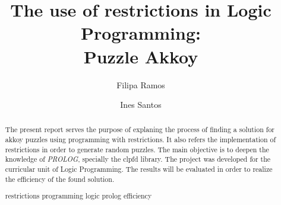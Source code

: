 \documentclass[runningheads,a4paper]{llncs}
\newcommand{\keywords}[1]{\par\addvspace\baselineskip
\noindent\keywordname\enspace\ignorespaces#1}
\begin{document}
\mainmatter  %

\title{The use of restrictions in Logic Programming:\\Puzzle Akkoy}


%
%
\author{Filipa Ramos
\and Ines Santos}
%


%
%

\maketitle


\begin{abstract}
The present report serves the purpose of explaning the process of finding a solution for akkoy puzzles using programming with restrictions. It also refers the implementation of restrictions in order to generate random puzzles. The main objective is to deepen the knowledge of \emph {PROLOG}, specially the clpfd library. The project was developed for the curricular unit of Logic Programming. The results will be evaluated in order to realize the efficiency of the found solution.
\keywords{restrictions programming logic prolog efficiency}
\end{abstract}
\end{document}
